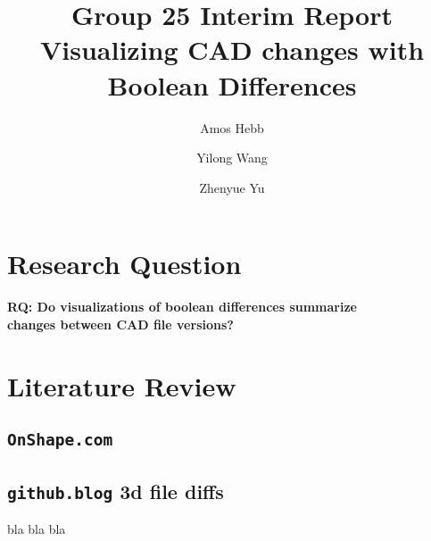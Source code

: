 \documentclass[sigconf,authorversion,nonacm]{acmart}
\begin{document}
\title{Group 25 Interim Report\\Visualizing CAD changes with Boolean Differences}

\author{Amos Hebb}
\author{Yilong Wang}
\author{Zhenyue Yu}
\makeatletter
\def\@ACM@checkaffil{%
	\if@ACM@instpresent\else
		\ClassWarningNoLine{\@classname}{No institution present for an affiliation}%
	\fi
	\if@ACM@citypresent\else
		\ClassWarningNoLine{\@classname}{No city present for an affiliation}%
	\fi
	\if@ACM@countrypresent\else
		\ClassWarningNoLine{\@classname}{No country present for an affiliation}%
	\fi
}
\makeatother

\maketitle

\section{Research Question}

\textbf{RQ: Do visualizations of boolean differences summarize\\changes between CAD file versions?}

\section{Literature Review}

\subsection{\texttt{OnShape.com}}

\subsection{\texttt{github.blog} 3d file diffs}

bla bla bla~\cite{cheng2023age}


\end{document}
